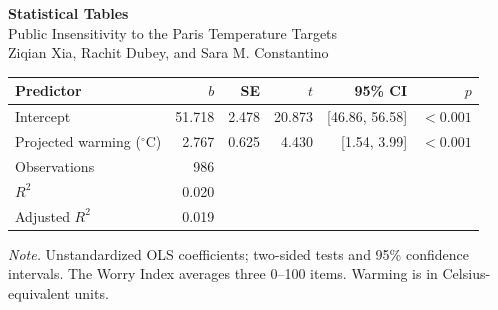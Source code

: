 \documentclass[11pt,a4paper]{article}
\begin{document}
\begin{center}
{\Large\bfseries Statistical Tables}\\[0.5em]
Public Insensitivity to the Paris Temperature Targets\\[0.5em]
Ziqian Xia, Rachit Dubey, and Sara M. Constantino
\end{center}
\bigskip
{}\label{tab:1}
\begingroup\small
\begin{tabularx}{\textwidth}{@{}Xrrrrr@{}}
\toprule
Predictor & $b$ & SE & $t$ & 95\% CI & $p$ \\
\midrule
Intercept & 51.718 & 2.478 & 20.873 & [46.86, 56.58] & $<0.001$ \\
Projected warming ($^\circ$C) & 2.767 & 0.625 & 4.430 & [1.54, 3.99] & $<0.001$ \\
Observations & 986 &  &  &  &  \\
$R^2$ & 0.020 &  &  &  &  \\
Adjusted $R^2$ & 0.019 &  &  &  &  \\
\bottomrule\end{tabularx}
\par\smallskip
{\footnotesize\textit{Note.} Unstandardized OLS coefficients; two-sided tests and 95\% confidence intervals. The Worry Index averages three 0--100 items. Warming is in Celsius-equivalent units.\par}
\endgroup\bigskip
\clearpage
{}\label{tab:2}
\begingroup\small{}
\setlength{\LTleft}{\fill}\setlength{\LTright}{\fill}
\addtocounter{table}{-1}
\end{document}
